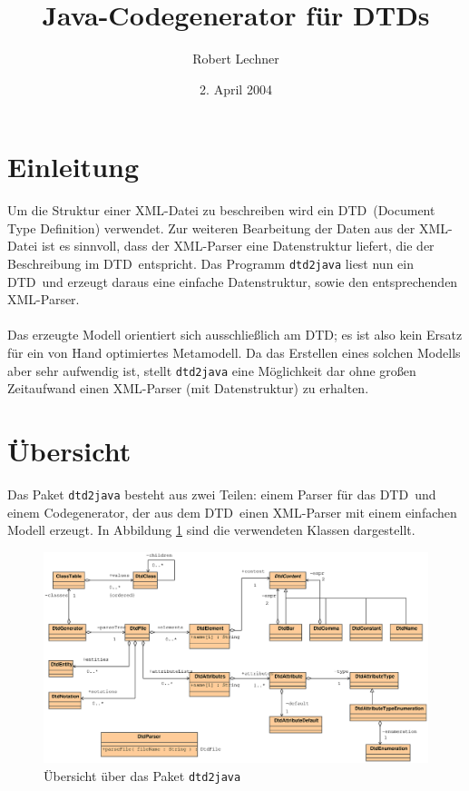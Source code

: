 \documentclass [a4paper,12pt] {scrartcl}
\author{Robert Lechner}
\title{Java-Codegenerator f{\"u}r DTDs}
\date{2. April 2004}
\newcommand{\DTD}{{\sffamily\small DTD}}
\newcommand{\XML}{{\sffamily\small XML}}
\begin{document}
\maketitle
\section{Einleitung}
Um die Struktur einer \XML-Datei zu beschreiben wird ein \DTD\ (Document Type Definition)
verwendet. Zur weiteren Bearbeitung der Daten aus der \XML-Datei ist es sinnvoll,
dass der \XML-Parser eine Datenstruktur liefert, die der Beschreibung im \DTD\ entspricht.
Das Programm \texttt{dtd2java} liest nun ein \DTD\ und erzeugt daraus eine einfache
Datenstruktur, sowie den entsprechenden \XML-Parser.\\
~\\
Das erzeugte Modell orientiert sich ausschlie{\ss}lich am \DTD; es ist also kein Ersatz
f{\"u}r ein von Hand optimiertes Metamodell. Da das Erstellen eines solchen Modells aber
sehr aufwendig ist, stellt \texttt{dtd2java} eine M{\"o}glichkeit dar ohne gro{\ss}en
Zeitaufwand einen \XML-Parser (mit Datenstruktur) zu erhalten.

\section{{\"U}bersicht}
Das Paket \texttt{dtd2java} besteht aus zwei Teilen:
einem Parser f{\"u}r das \DTD\ und einem Codegenerator,
der aus dem \DTD\ einen \XML-Parser mit einem einfachen Modell erzeugt.
In Abbildung \ref{fig:dtd2java-classes} sind die verwendeten Klassen dargestellt.
\begin{figure}[ht!]
\centerline{\includegraphics[width=1.1 \linewidth]{classes.eps}}
\caption{{\"U}bersicht {\"u}ber das Paket \texttt{dtd2java}}
\label{fig:dtd2java-classes}
\end{figure}
\end{document}
